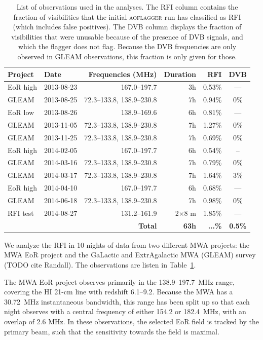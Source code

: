 \documentclass[useAMS,usenatbib]{mn2e}
\begin{document}
\begin{table}
\caption{List of observations used in the analyses. The RFI column contains the fraction of visibilities that the initial \textsc{aoflagger} run has classified as RFI (which includes false positives). The DVB column displays the fraction of visibilities that were unusable because of the presence of DVB signals, and which the flagger does not flag. Because the DVB frequencies are only observed in GLEAM observations, this fraction is only given for those. }\label{tbl:obs-list}
\begin{tabular}{|l|l|r|r|r|c|}
\hline
\textbf{Project} &\textbf{Date} & \textbf{Frequencies (MHz)} & \textbf{Duration} & RFI & DVB \\
\hline
EoR high& 2013-08-23 & 167.0--197.7              & 3h & 0.53\% & ---\\
GLEAM & 2013-08-25 & 72.3--133.8, 138.9--230.8 & 7h & 0.94\% & 0\% \\
EoR low& 2013-08-26 & 138.9--169.6              & 6h & 0.81\% & ---\\
GLEAM & 2013-11-05 & 72.3--133.8, 138.9--230.8 & 7h & 1.27\% & 0\% \\
GLEAM & 2013-11-25 & 72.3--133.8, 138.9--230.8 & 7h & 0.69\% & 0\% \\
EoR high& 2014-02-05 & 167.0--197.7              & 6h & 0.54\% & -- \\
GLEAM & 2014-03-16 & 72.3--133.8, 138.9--230.8 & 7h & 0.79\% & 0\% \\
GLEAM & 2014-03-17 & 72.3--133.8, 138.9--230.8 & 7h & 1.64\% & 3\% \\
EoR high& 2014-04-10 & 167.0--197.7              & 6h & 0.68\% & ---\\
GLEAM & 2014-06-18 & 72.3--133.8, 138.9--230.8 & 7h & 0.98\% & 0\% \\
RFI test&2014-08-27& 131.2--161.9     & 2$\times$8 m& 1.85\% & --- \\
\hline
\multicolumn{3}{|r|}{\textbf{Total}} & \textbf{63h} & \textbf{...\%} & \textbf{0.5\%}\\
\hline
\end{tabular}
\end{table}

We analyze the RFI in 10 nights of data from two different MWA projects: the MWA EoR project \citep{bowman-science-with-the-mwa-2013} and the GaLactic and ExtrAgalactic MWA (GLEAM) survey (TODO cite Randall). The observations are listen in Table~\ref{tbl:obs-list}.

The MWA EoR project observes primarily in the 138.9--197.7~MHz range, covering the HI 21-cm line with redshift 6.1--9.2. Because the MWA has a 30.72~MHz instantaneous bandwidth, this range has been split up so that each night observes with a central frequency of either 154.2 or 182.4~MHz, with an overlap of 2.6 MHz. In these observations, the selected EoR field is tracked by the primary beam, such that the sensitivity towards the field is maximal.
\end{document}
